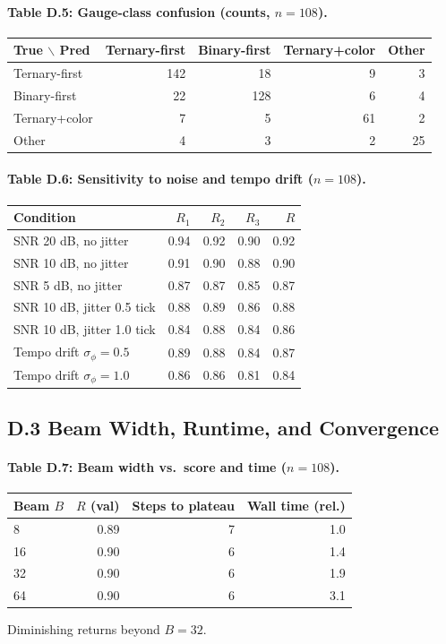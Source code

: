 \documentclass[12pt]{article}
\numberwithin{equation}{section}
\theoremstyle{plain}
\theoremstyle{definition}
\theoremstyle{remark}
\begin{document}
\paragraph{Table D.5: Gauge-class confusion (counts, $n=108$).}
\begin{tabular}{lrrrr}
\toprule
True $\backslash$ Pred & Ternary-first & Binary-first & Ternary+color & Other \\
\midrule
Ternary-first   & 142 & 18 & 9 & 3 \\
Binary-first    & 22  & 128 & 6 & 4 \\
Ternary+color   & 7   & 5  & 61 & 2 \\
Other           & 4   & 3  & 2 & 25 \\
\bottomrule
\end{tabular}

\paragraph{Table D.6: Sensitivity to noise and tempo drift ($n=108$).}
\begin{tabular}{lrrrr}
\toprule
Condition & $R_1$ & $R_2$ & $R_3$ & $R$ \\
\midrule
SNR 20 dB, no jitter      & 0.94 & 0.92 & 0.90 & 0.92 \\
SNR 10 dB, no jitter      & 0.91 & 0.90 & 0.88 & 0.90 \\
SNR 5 dB, no jitter       & 0.87 & 0.87 & 0.85 & 0.87 \\
SNR 10 dB, jitter 0.5 tick& 0.88 & 0.89 & 0.86 & 0.88 \\
SNR 10 dB, jitter 1.0 tick& 0.84 & 0.88 & 0.84 & 0.86 \\
Tempo drift $\sigma_\phi=0.5$ & 0.89 & 0.88 & 0.84 & 0.87 \\
Tempo drift $\sigma_\phi=1.0$ & 0.86 & 0.86 & 0.81 & 0.84 \\
\bottomrule
\end{tabular}

\subsection*{D.3 Beam Width, Runtime, and Convergence}
\paragraph{Table D.7: Beam width vs.\ score and time ($n=108$).}
\begin{tabular}{lrrr}
\toprule
Beam $B$ & $R$ (val) & Steps to plateau & Wall time (rel.) \\
\midrule
8   & 0.89 & 7  & 1.0 \\
16  & 0.90 & 6  & 1.4 \\
32  & 0.90 & 6  & 1.9 \\
64  & 0.90 & 6  & 3.1 \\
\bottomrule
\end{tabular}
Diminishing returns beyond $B{=}32$.
\end{document}
